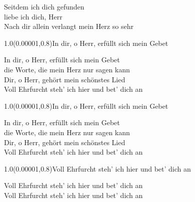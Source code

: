 \documentclass[aspectratio=169]{beamer}
\begin{document}
\begin{frame}
\centering
\color{white}
\huge{Seitdem ich dich gefunden} \\
\huge{liebe ich dich, Herr} \\
\huge{Nach dir allein verlangt mein Herz so sehr} \\

\begin{textblock}{1.0}(0.00001,0.8)\color{gray}\normalsize{In dir, o Herr, erfüllt sich mein Gebet}\end{textblock}
\end{frame}

\begin{frame}
\centering
\color{white}
\huge{In dir, o Herr, erfüllt sich mein Gebet} \\
\huge{die Worte, die mein Herz nur sagen kann} \\
\huge{Dir, o Herr, gehört mein schönstes Lied} \\
\huge{Voll Ehrfurcht steh' ich hier und bet' dich an} \\

\begin{textblock}{1.0}(0.00001,0.8)\color{gray}\normalsize{In dir, o Herr, erfüllt sich mein Gebet}\end{textblock}
\end{frame}

\begin{frame}
\centering
\color{white}
\huge{In dir, o Herr, erfüllt sich mein Gebet} \\
\huge{die Worte, die mein Herz nur sagen kann} \\
\huge{Dir, o Herr, gehört mein schönstes Lied} \\
\huge{Voll Ehrfurcht steh' ich hier und bet' dich an} \\

\begin{textblock}{1.0}(0.00001,0.8)\color{gray}\normalsize{Voll Ehrfurcht steh' ich hier und bet' dich an}\end{textblock}
\end{frame}

\begin{frame}
\centering
\color{white}
\huge{Voll Ehrfurcht steh' ich hier und bet' dich an} \\
\huge{Voll Ehrfurcht steh' ich hier und bet' dich an} \\
\end{frame}
\end{document}
